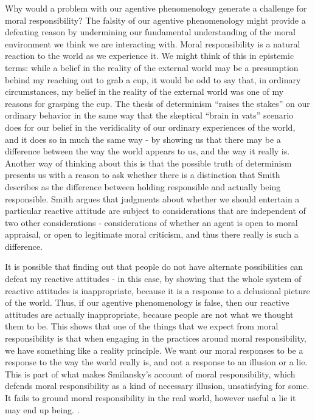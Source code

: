 \documentclass[phd,12pt,oneside,paper=letterpaper]{ubcthesis}
\begin{document}
Why would a problem with our agentive phenomenology generate a challenge for moral responsibility? The falsity of our agentive phenomenology might provide a defeating reason by undermining our fundamental understanding of the moral environment we think we are interacting with. Moral responsibility is a natural reaction to the world as we experience it. We might think of this in epistemic terms: while a belief in the reality of the external world may be a presumption behind my reaching out to grab a cup, it would be odd to say that, in ordinary circumstances, my belief in the reality of the external world was one of my reasons for grasping the cup. The thesis of determinism ``raises the stakes'' on our ordinary behavior in the same way that the skeptical ``brain in vats'' scenario does for our belief in the veridicality of our ordinary experiences of the world, and it does so in much the same way - by showing us that there may be a difference between the way the world appears to us, and the way it really is. Another way of thinking about this is that the possible truth of determinism presents us with a reason to ask whether there is a distinction that Smith \citeyearpar{smith2007} describes as the difference between holding responsible and actually being responsible. Smith argues that judgments about whether we should entertain a particular reactive attitude are subject to considerations that are independent of two other considerations - considerations of whether an agent is open to moral appraisal, or open to legitimate moral criticism, and thus there really is such a difference.

It is possible that finding out that people do not have alternate possibilities can defeat my reactive attitudes - in this case, by showing that the whole system of reactive attitudes is inappropriate, because it is a response to a delusional picture of the world. Thus, if our agentive phenomenology is false, then our reactive attitudes are actually inappropriate, because people are not what we thought them to be. This shows that one of the things that we expect from moral responsibility is that when engaging in the practices around moral responsibility, we have something like a reality principle. We want our moral responses to be a response to the way the world really is, and not a response to an illusion or a lie. This is part of what makes Smilansky's account of moral responsibility, which defends moral responsibility as a kind of necessary illusion, unsatisfying for some. It fails to ground moral responsibility in the real world, however useful a lie it may end up being. \citep{smilansky2000}. 
\end{document}
